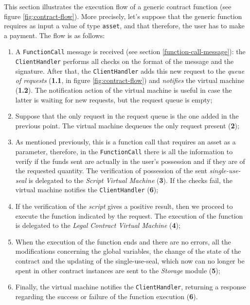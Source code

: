This section illustrates the execution flow of a generic contract function (see figure 
\ref{fig:contract-flow}). More precisely, let's suppose that the generic function requires as input a 
value of type \verb|asset|, and that therefore, the user has to make a payment. The flow is as follows:
\begin{enumerate}
  \item A \verb|FunctionCall| message is received (see section \ref{function-call-message}): the 
  \verb|ClientHandler| performs all checks on the format of the message and the signature. After that, the 
  \verb|ClientHandler| adds this new request to the \textit{queue of requests} (\textbf{1.1}, in figure 
  \ref{fig:contract-flow}) and \textit{notifies} the virtual machine (\textbf{1.2}). The notification 
  action of the virtual machine is useful in case the latter is waiting for new requests, but the request 
  queue is empty;
  \item Suppose that the only request in the request queue is the one added in the previous point. The 
  virtual machine dequeues the only request present (\textbf{2});
  \item As mentioned previously, this is a function call that requires an asset as a parameter, therefore, 
  in the \verb|FunctionCall| there is all the information to verify if the funds sent are actually in the 
  user's possession and if they are of the requested quantity. The verification of possession of the sent 
  \textit{single-use-seal} is delegated to the \textit{Script Virtual Machine} (\textbf{3}). If the checks 
  fail, the virtual machine notifies the \verb|ClientHandler| (\textbf{6});
  \item If the verification of the \textit{script} gives a positive result, then we proceed to execute the 
  function indicated by the request. The execution of the function is delegated to the 
  \textit{Legal Contract Virtual Machine} (\textbf{4});
  \item When the execution of the function ends and there are no errors, all the modifications concerning 
  the global variables, the change of the state of the contract and the updating of the single-use-seal, 
  which now can no longer be spent in other contract instances are sent to the \textit{Storage} module 
  (\textbf{5});
  \item Finally, the virtual machine notifies the \verb|ClientHandler|, returning a response regarding the 
  success or failure of the function execution (\textbf{6}).
\end{enumerate}

